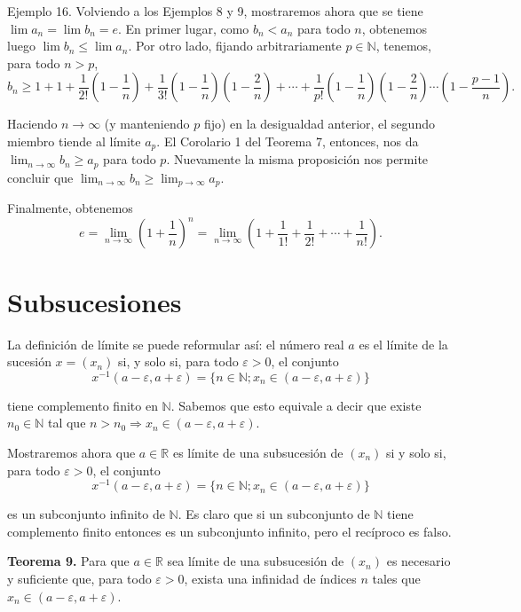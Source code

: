 \documentclass[12pt,oneside]{book}
\begin{document}
Ejemplo 16. Volviendo a los Ejemplos 8 y 9, mostraremos ahora que se tiene \(\lim a_n = \lim b_n = e\). En primer lugar, como \(b_n < a_n\) para todo \(n\), obtenemos luego \(\lim b_n \le \lim a_n\). Por otro lado, fijando arbitrariamente \(p \in \mathbb{N}\), tenemos, para todo \(n > p\),
\[b_n \ge 1 + 1 + \frac{1}{2!} \left(1 - \frac{1}{n}\right) + \frac{1}{3!} \left(1 - \frac{1}{n}\right) \left(1 - \frac{2}{n}\right) + \cdots + \frac{1}{p!} \left(1 - \frac{1}{n}\right) \left(1 - \frac{2}{n}\right) \cdots \left(1 - \frac{p-1}{n}\right).\]

Haciendo \(n \to \infty\) (y manteniendo \(p\) fijo) en la desigualdad anterior, el segundo miembro tiende al límite \(a_p\). El Corolario 1 del Teorema 7, entonces, nos da \(\lim_{n \to \infty} b_n \ge a_p\) para todo \(p\). Nuevamente la misma proposición nos permite concluir que \(\lim_{n \to \infty} b_n \ge \lim_{p \to \infty} a_p\).

Finalmente, obtenemos
\[e = \lim_{n \to \infty} \left(1 + \frac{1}{n}\right)^n = \lim_{n \to \infty} \left(1 + \frac{1}{1!} + \frac{1}{2!} + \cdots + \frac{1}{n!}\right).\]

\section{Subsucesiones}

La definición de límite se puede reformular así: el número real \(a\) es el límite de la sucesión \(x = (x_n)\) si, y solo si, para todo \(\varepsilon > 0\), el conjunto
\[
x^{-1}(a - \varepsilon, a + \varepsilon) = \{n \in \mathbb{N}; x_n \in (a - \varepsilon, a + \varepsilon)\}
\]

tiene complemento finito en \(\mathbb{N}\). Sabemos que esto equivale a decir que existe \(n_0 \in \mathbb{N}\) tal que \(n > n_0 \Rightarrow x_n \in (a - \varepsilon, a + \varepsilon)\).

Mostraremos ahora que \(a \in \mathbb{R}\) es límite de una subsucesión de \((x_n)\) si y solo si, para todo \(\varepsilon > 0\), el conjunto
\[
x^{-1}(a - \varepsilon, a + \varepsilon) = \{n \in \mathbb{N}; x_n \in (a - \varepsilon, a + \varepsilon)\}
\]

es un subconjunto infinito de \(\mathbb{N}\). Es claro que si un subconjunto de \(\mathbb{N}\) tiene complemento finito entonces es un subconjunto infinito, pero el recíproco es falso.

\textbf{Teorema 9.} Para que \(a \in \mathbb{R}\) sea límite de una subsucesión de \((x_n)\) es necesario y suficiente que, para todo \(\varepsilon > 0\), exista una infinidad de índices \(n\) tales que \(x_n \in (a - \varepsilon, a + \varepsilon)\).
\end{document}
